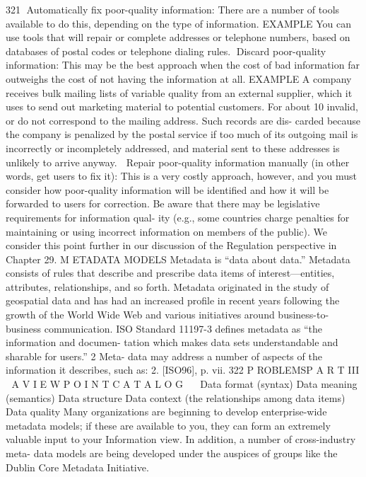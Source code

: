  321
Automatically fix poor-quality information: There are a number of tools
available to do this, depending on the type of information.
EXAMPLE You can use tools that will repair or complete addresses or
telephone numbers, based on databases of postal codes or telephone
dialing rules.
Discard poor-quality information: This may be the best approach when
the cost of bad information far outweighs the cost of not having the
information at all.
EXAMPLE A company receives bulk mailing lists of variable quality from
an external supplier, which it uses to send out marketing material to
potential customers. For about 10%
invalid, or do not correspond to the mailing address. Such records are dis-
carded because the company is penalized by the postal service if too much
of its outgoing mail is incorrectly or incompletely addressed, and material
sent to these addresses is unlikely to arrive anyway.
 Repair poor-quality information manually (in other words, get users to
fix it): This is a very costly approach, however, and you must consider
how poor-quality information will be identified and how it will be
forwarded to users for correction.
Be aware that there may be legislative requirements for information qual-
ity (e.g., some countries charge penalties for maintaining or using incorrect
information on members of the public). We consider this point further in our
discussion of the Regulation perspective in Chapter 29.
M ETADATA MODELS Metadata is “data about data.” Metadata consists of
rules that describe and prescribe data items of interest—entities, attributes,
relationships, and so forth. Metadata originated in the study of geospatial
data and has had an increased profile in recent years following the growth of
the World Wide Web and various initiatives around business-to-business
communication.
ISO Standard 11197-3 defines metadata as “the information and documen-
tation which makes data sets understandable and sharable for users.” 2 Meta-
data may address a number of aspects of the information it describes, such as:
2. [ISO96], p. vii.
322
P ROBLEMSP A R T III  A V I E W P O I N T C A T A L O G
Data format (syntax)
Data meaning (semantics)
Data structure
Data context (the relationships among data items)
Data quality
Many organizations are beginning to develop enterprise-wide metadata
models; if these are available to you, they can form an extremely valuable
input to your Information view. In addition, a number of cross-industry meta-
data models are being developed under the auspices of groups like the Dublin
Core Metadata Initiative.
